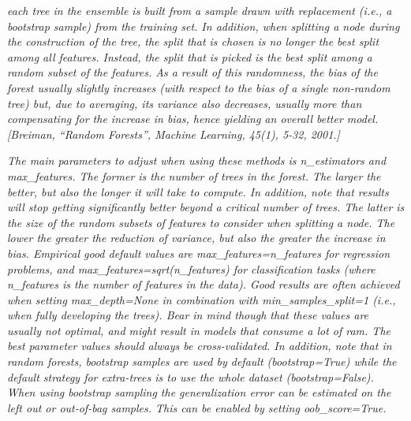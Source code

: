 \textit{each tree in the ensemble is built from a sample drawn with replacement (i.e., a bootstrap sample) from the training set. In addition, when splitting a node during the construction of the tree, the split that is chosen is no longer the best split among all features. Instead, the split that is picked is the best split among a random subset of the features. As a result of this randomness, the bias of the forest usually slightly increases (with respect to the bias of a single non-random tree) but, due to averaging, its variance also decreases, usually more than compensating for the increase in bias, hence yielding an overall better model. [Breiman, “Random Forests”, Machine Learning, 45(1), 5-32, 2001.]}

\textit{The main parameters to adjust when using these methods is n_estimators and max_features. The former is the number of trees in the forest. The larger the better, but also the longer it will take to compute. In addition, note that results will stop getting significantly better beyond a critical number of trees. The latter is the size of the random subsets of features to consider when splitting a node. The lower the greater the reduction of variance, but also the greater the increase in bias. Empirical good default values are max_features=n_features for regression problems, and max_features=sqrt(n_features) for classification tasks (where n_features is the number of features in the data). Good results are often achieved when setting max_depth=None in combination with min_samples_split=1 (i.e., when fully developing the trees). Bear in mind though that these values are usually not optimal, and might result in models that consume a lot of ram. The best parameter values should always be cross-validated. In addition, note that in random forests, bootstrap samples are used by default (bootstrap=True) while the default strategy for extra-trees is to use the whole dataset (bootstrap=False). When using bootstrap
sampling the generalization error can be estimated on the left out or out-of-bag samples. This can be enabled by setting oob_score=True.
}
